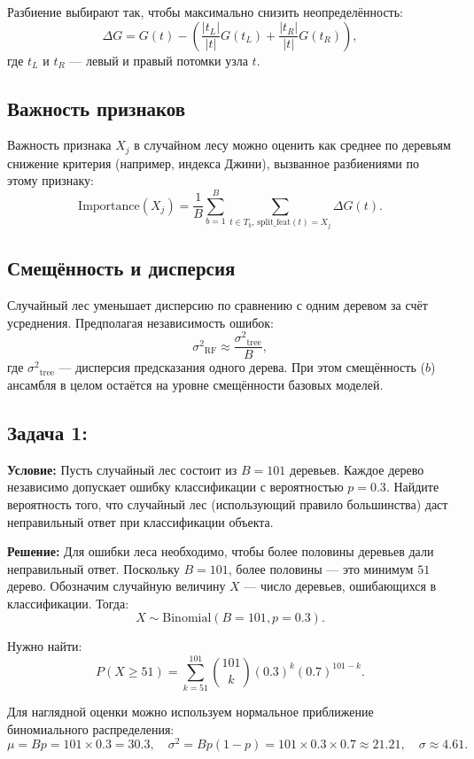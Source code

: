 Разбиение выбирают так, чтобы максимально снизить неопределённость:
\[
    \Delta G = G(t) - \left( \frac{|t_L|}{|t|} G(t_L) + \frac{|t_R|}{|t|} G(t_R)\right),
\]
где \(t_L\) и \(t_R\) — левый и правый потомки узла \(t\).

\subsection*{Важность признаков}

Важность признака \(X_j\) в случайном лесу можно оценить как среднее по деревьям снижение критерия (например, индекса Джини), вызванное разбиениями по этому признаку:
\[
    \text{Importance}(X_j) = \frac{1}{B} \sum_{b=1}^B \sum_{t \in T_b, \, \text{split\_feat}(t)=X_j} \Delta G(t).
\]

\subsection*{Смещённость и дисперсия}

Случайный лес уменьшает дисперсию по сравнению с одним деревом за счёт усреднения. Предполагая независимость ошибок:
\[
    {\sigma^2}_{\text{RF}} \approx \frac{{\sigma^2}_{\text{tree}}}{B},
\]
где \({\sigma^2}_{\text{tree}}\) — дисперсия предсказания одного дерева. При этом смещённость ($b$) ансамбля в целом остаётся на уровне смещённости базовых моделей.

\subsection*{Задача 1:}

\textbf{Условие:} Пусть случайный лес состоит из \(B = 101\) деревьев. Каждое дерево независимо допускает ошибку классификации с вероятностью \(p = 0.3\). Найдите вероятность того, что случайный лес (использующий правило большинства) даст неправильный ответ при классификации объекта.

\textbf{Решение:}
Для ошибки леса необходимо, чтобы более половины деревьев дали неправильный ответ. Поскольку \(B = 101\), более половины — это минимум \(51\) дерево. Обозначим случайную величину \(X\) — число деревьев, ошибающихся в классификации. Тогда:
\[
    X \sim \text{Binomial}(B=101, p=0.3).
\]

Нужно найти:
\[
    P(X \geq 51) = \sum_{k=51}^{101} \binom{101}{k} (0.3)^k (0.7)^{101-k}.
\]

Для наглядной оценки можно используем нормальное приближение биномиального распределения:
\[
    \mu = Bp = 101 \times 0.3 = 30.3, \quad \sigma^2 = Bp(1-p) = 101 \times 0.3 \times 0.7 \approx 21.21, \quad \sigma \approx 4.61.
\]

